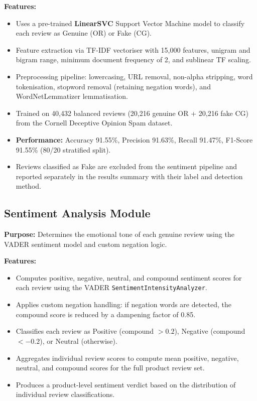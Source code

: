 \documentclass[12pt,a4paper]{report}
\begin{document}
\textbf{Features:}
\begin{itemize}
  \item Uses a pre-trained \textbf{LinearSVC} Support Vector Machine model to classify each review as Genuine (OR) or Fake (CG).
  \item Feature extraction via TF-IDF vectoriser with 15,000 features, unigram and bigram range, minimum document frequency of 2, and sublinear TF scaling.
  \item Preprocessing pipeline: lowercasing, URL removal, non-alpha stripping, word tokenisation, stopword removal (retaining negation words), and WordNetLemmatizer lemmatisation.
  \item Trained on 40,432 balanced reviews (20,216 genuine OR + 20,216 fake CG) from the Cornell Deceptive Opinion Spam dataset.
  \item \textbf{Performance:} Accuracy 91.55\%, Precision 91.63\%, Recall 91.47\%, F1-Score 91.55\% (80/20 stratified split).
  \item Reviews classified as Fake are excluded from the sentiment pipeline and reported separately in the results summary with their label and detection method.
\end{itemize}

\subsection{Sentiment Analysis Module}

\textbf{Purpose:} Determines the emotional tone of each genuine review using the VADER sentiment model and custom negation logic.

\textbf{Features:}
\begin{itemize}
  \item Computes positive, negative, neutral, and compound sentiment scores for each review using the VADER \texttt{SentimentIntensityAnalyzer}.
  \item Applies custom negation handling: if negation words are detected, the compound score is reduced by a dampening factor of 0.85.
  \item Classifies each review as Positive (compound $> 0.2$), Negative (compound $< -0.2$), or Neutral (otherwise).
  \item Aggregates individual review scores to compute mean positive, negative, neutral, and compound scores for the full product review set.
  \item Produces a product-level sentiment verdict based on the distribution of individual review classifications.
\end{itemize}
\end{document}
